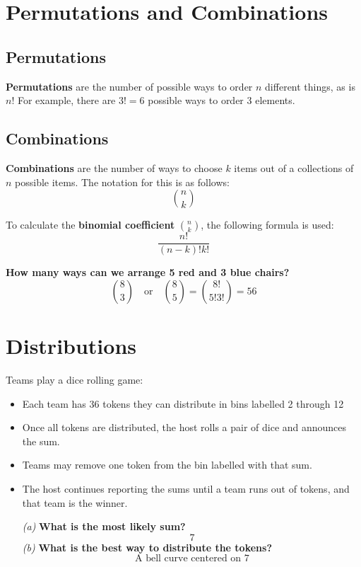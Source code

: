 \documentclass[titlepage, 12pt, leqno]{article}
\begin{document}
\section{Permutations and Combinations}
\subsection{Permutations}
\begin{definition}
    \textbf{Permutations} are the number of possible ways to order $n$ different things, as is $n!$ For example, there are $3! = 6$ possible ways to order 3 elements.
\end{definition}

\subsection{Combinations}
\begin{definition}
    \textbf{Combinations} are the number of ways to choose $k$ items out of a collections of $n$ possible items. The notation for this is as follows:
    \[
        \binom{n}{k}
    \]
\end{definition}
To calculate the \textbf{binomial coefficient} $\binom{n}{k}$, the following formula is used:
\[
    \frac{n!}{(n-k)! k!}
\]
\begin{ex}
    \textbf{How many ways can we arrange 5 red and 3 blue chairs?} 
    \[
      \binom{8}{3} \quad \text{or} \quad \binom{8}{5} = \binom{8!}{5!3!} = \boxed{56} 
    \]
\end{ex}
\pagebreak
\section{Distributions}
\begin{ex}
    Teams play a dice rolling game:
    \begin{itemize}
        \item Each team has 36 tokens they can distribute in bins labelled 2 through 12
        \item Once all tokens are distributed, the host rolls a pair of dice and announces the sum.
        \item Teams may remove one token from the bin labelled with that sum.
        \item The host continues reporting the sums until a team runs out of tokens, and that team is the winner.

        \textit{(a)} \textbf{What is the most likely sum?} 
        \[
        \boxed{7} 
        \]
        \textit{(b)} \textbf{What is the best way to distribute the tokens?} 
        \[
        \boxed{\text{A bell curve centered on 7}}
        \]
    \end{itemize}
\end{ex}
\end{document}
